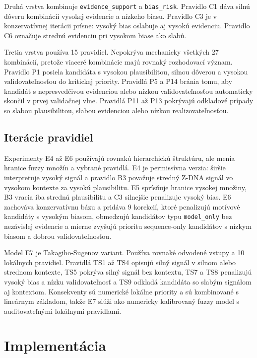 \documentclass[12pt,a4paper]{article}
\begin{document}
Druhá vrstva kombinuje \texttt{evidence\_support} a \texttt{bias\_risk}. Pravidlo C1 dáva silnú dôveru kombinácii vysokej evidencie a nízkeho biasu. Pravidlo C3 je v konzervatívnej iterácii prísne: vysoký bias oslabuje aj vysokú evidenciu. Pravidlo C6 označuje strednú evidenciu pri vysokom biase ako slabú.

Tretia vrstva používa 15 pravidiel. Nepokrýva mechanicky všetkých 27 kombinácií, pretože viaceré kombinácie majú rovnaký rozhodovací význam. Pravidlo P1 posiela kandidáta s vysokou plausibilitou, silnou dôverou a vysokou validovateľnosťou do kritickej priority. Pravidlá P5 a P14 bránia tomu, aby kandidát s nepresvedčivou evidenciou alebo nízkou validovateľnosťou automaticky skončil v prvej validačnej vlne. Pravidlá P11 až P13 pokrývajú odkladové prípady so slabou plausibilitou, slabou evidenciou alebo nízkou realizovateľnosťou.

\subsection{Iterácie pravidiel}

Experimenty E4 až E6 používajú rovnakú hierarchickú štruktúru, ale menia hranice fuzzy množín a vybrané pravidlá. E4 je permissívna verzia: širšie interpretuje vysoký signál a pravidlo B3 považuje stredný Z-DNA signál vo vysokom kontexte za vysokú plausibilitu. E5 sprísňuje hranice vysokej množiny, B3 vracia iba strednú plausibilitu a C3 silnejšie penalizuje vysoký bias. E6 zachováva konzervatívnu bázu a pridáva 9 korekcií, ktoré penalizujú motívové kandidáty s vysokým biasom, obmedzujú kandidátov typu \texttt{model\_only} bez nezávislej evidencie a mierne zvyšujú prioritu sequence-only kandidátov s nízkym biasom a dobrou validovateľnosťou.

Model E7 je Takagiho-Sugenov variant. Používa rovnaké odvodené vstupy a 10 lokálnych pravidiel. Pravidlá TS1 až TS4 opisujú silný signál v silnom alebo strednom kontexte, TS5 pokrýva silný signál bez kontextu, TS7 a TS8 penalizujú vysoký bias a nízku validovateľnosť a TS9 odkladá kandidáta so slabým signálom aj kontextom. Konsekventy sú numerické lokálne priority a sú kombinované s lineárnym základom, takže E7 slúži ako numericky kalibrovaný fuzzy model s auditovateľnými lokálnymi pravidlami.

\section{Implementácia}
\end{document}
